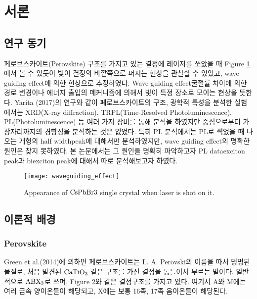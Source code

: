 
\section{서론}
\subsection{연구 동기}

페로브스카이트(Perovskite) 구조를 가지고 있는 결정에 레이저를 쏘았을 때 Figure \ref{fig:waveguide} 에서 볼 수 있듯이 빛이 결정의 바깥쪽으로 퍼지는 현상을 관찰할 수 있었고, wave guiding effect에 의한 현상으로 추정하였다. Wave guiding effect\는 굴절률 차이에 의한 경로 변경이나 에너지 출입의 메커니즘에 의해서 빛이 특정 장소로 모이는 현상을 뜻한다. Yarita (2017)의 연구와 같이 페로브스카이트의 구조, 광학적 특성을 분석한 실험에서는 XRD(X-ray diffraction), TRPL(Time-Resolved Photoluminescence), PL(Photoluminescence) 등 여러 가지 장비를 통해 분석을 하였지만 중심으로부터 가장자리까지의 경향성을 분석하는 것은 없었다\cite{yarita2017dynamics}. 특히 PL 분석에서는 PL로 찍었을 때 나오는 개형의 half width\과 peak에 대해서만 분석하였지만, wave guiding effect의 명확한 원인은 찾지 못하였다. 본 논문에서는 그 원인을 명확히 파악하고자 PL data\를 exciton peak과 biexciton peak에 대해서 따로 분석해보고자 하였다. 

\begin{figure}[H]
	\begin{center}
			\texttt{[image: waveguiding\_effect]}
	\end{center}
	\caption{Appearance of $\rm CsPbBr3$ single crystal when laser is shot on it.}
	\label{fig:waveguide}  
\end{figure}

\subsection{이론적 배경}

\subsubsection{Perovskite}
Green et al.(2014)에 의하면 페로브스카이트는 L. A. Perovski의 이름을 따서 명명된 물질로, 처음 발견된 $\rm CaTiO_3$  같은 구조를 가진 결정을 통틀어서 부르는 말이다. 일반적으로 $\rm ABX_3$로 쓰며, Figure 2와 같은 결정구조를 가지고 있다. 여기서 A와 M에는 여러 금속 양이온들이 해당되고, X에는 보통 16족, 17족 음이온들이 해당된다.


